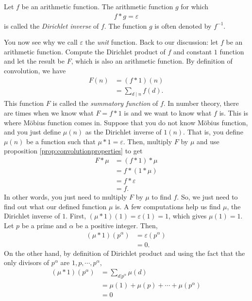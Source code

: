 \documentclass[12pt]{subfile}
\begin{document}
		\begin{definition}
			Let $f$ be an arithmetic function. The arithmetic function $g$ for which
				\begin{align*}
					f \ast g = \varepsilon
				\end{align*}
			is called the \textit{Dirichlet inverse} of $f$. The function $g$ is often denoted by $f^{-1}$.
		\end{definition}
	You now see why we call $\varepsilon$ the \textit{unit} function. Back to our discussion: let $f$ be an arithmetic function. Compute the Dirichlet product of $f$ and constant $1$ function and let the result be $F$, which is also an arithmetic function. By definition of convolution, we have
		\begin{align*}
			F(n) &= (f\ast 1)(n)\\
			     &= \sum_{d\mid n} f(d).
		\end{align*}
	This function $F$ is called the \textit{summatory function} of $f$. In number theory, there are times when we know what $F=f\ast 1$ is and we want to know what $f$ is. This is where M\"{o}bius function comes in. Suppose that you do not know M\"{o}bius function, and you just define $\mu(n)$ as the Dirichlet inverse of $1(n)$. That is, you define $\mu(n)$ be a function such that $\mu \ast 1 = \varepsilon$. Then, multiply $F$ by $\mu$ and use proposition \ref{prop:convolutionproperties} to get
		\begin{align*}
			F \ast \mu &= (f \ast 1) \ast \mu\\
					   &= f \ast (1 \ast \mu)\\
					   &= f \ast \varepsilon\\
					   &=f.
		\end{align*}
	In other words, you just need to multiply $F$ by $\mu$ to find $f$. So, we just need to find out what our defined function $\mu$ is. A few computations help us find $\mu$, the Dirichlet inverse of $1$. First, $(\mu \ast 1)(1)=\varepsilon(1)=1$, which gives $\mu(1)=1$. Let $p$ be a prime and $\alpha$ be a positive integer. Then,
		\begin{align*}
			(\mu \ast 1)(p^\alpha) &= \varepsilon(p^\alpha)\\
							   &= 0.
		\end{align*}
	On the other hand, by definition of Dirichlet product and using the fact that the only divisors of $p^\alpha$ are $1,p,\cdots,p^\alpha$,
		\begin{align*}
			(\mu \ast 1)(p^\alpha) &= \sum_{d|p^\alpha}\mu(d)\\
							   &= \mu(1) + \mu(p) + \cdots + \mu(p^\alpha)\\
							   &= 0
		\end{align*}
\end{document}
